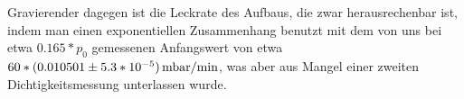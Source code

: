 \documentclass[]{article}
\begin{document}
	Gravierender dagegen ist die Leckrate des Aufbaus, die zwar herausrechenbar ist, indem man einen exponentiellen Zusammenhang benutzt mit dem von uns bei etwa $0.165*p_0$ gemessenen Anfangswert von etwa $60*(0.010501 \pm 5.3*10^{-5})\SI{}{ \, \milli \bar /{\minute}}$, was aber aus Mangel einer zweiten Dichtigkeitsmessung unterlassen wurde. \\
\end{document}
